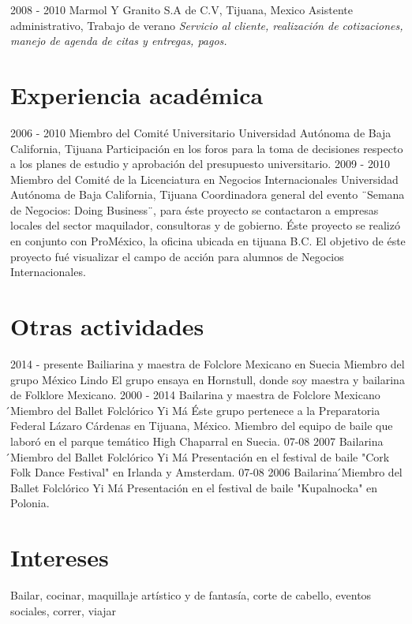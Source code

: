 \documentclass[]{friggeri-cv}
\begin{document}
\begin{entrylist}
  \entry
    {2008 - 2010}
    {Marmol Y Granito S.A de C.V, Tijuana, Mexico}
    {Asistente administrativo, Trabajo de verano}
    {\emph{Servicio al cliente, realización de cotizaciones, manejo de agenda de citas y entregas, pagos.}}
\end{entrylist}

\section{Experiencia académica}
\begin{entrylist}
  \entry
    {2006 - 2010}
    {Miembro del Comité Universitario}
    {Universidad Autónoma de Baja California, Tijuana}
    {Participación en los foros para la toma de decisiones respecto a los planes de estudio y aprobación del presupuesto universitario.}
  \entry
    {2009 - 2010}
    {Miembro del Comité de la Licenciatura en Negocios Internacionales}
    {Universidad Autónoma de Baja California, Tijuana}
    {Coordinadora general del evento ¨Semana de Negocios: Doing Business¨, para éste proyecto se contactaron a empresas locales del sector maquilador, consultoras y de gobierno.
    Éste proyecto se realizó en conjunto con ProMéxico, la oficina ubicada en tijuana B.C.
    El objetivo de éste proyecto fué visualizar el campo de acción para alumnos de Negocios Internacionales.}
\end{entrylist}

\section{Otras actividades}

\begin{entrylist}
  \entry
    {2014 - presente}
    {Bailiarina y maestra de Folclore Mexicano en Suecia}
    {Miembro del grupo México Lindo}
    {El grupo ensaya en Hornstull, donde soy maestra y bailarina de Folklore Mexicano.}
  \entry
    {2000 - 2014}
    {Bailarina y maestra de Folclore Mexicano}
    {́Miembro del Ballet Folclórico Yi Má}
    {Éste grupo pertenece a la Preparatoria Federal Lázaro Cárdenas en Tijuana, México.
    Miembro del equipo de baile que laboró en el parque temático High Chaparral en Suecia.}
  \entry
    {07-08 2007}
    {Bailarina}
    {́Miembro del Ballet Folclórico Yi Má}
    {Presentación en el festival de baile "Cork Folk
    Dance Festival" en Irlanda y Amsterdam.}
  \entry
    {07-08 2006}
    {Bailarina}
    {́Miembro del Ballet Folclórico Yi Má}
    {Presentación en el festival de baile "Kupalnocka" en Polonia.}
\end{entrylist}

\section{Intereses}
    Bailar, cocinar, maquillaje artístico y de fantasía, corte de cabello, eventos sociales, correr, viajar
\end{document}
